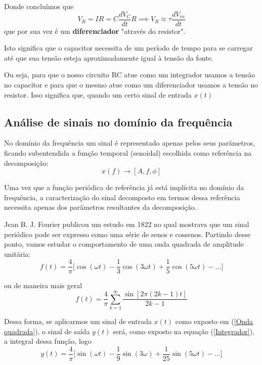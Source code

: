 \documentclass[letterpaper, 12pt]{article}
\begin{document}
Donde concluímos que
\begin{equation}
    V_{R}=IR=C\frac{dV_{C}}{dt}R\implies V_{R}\approx \tau\frac{dV_{in}}{dt}
\end{equation}
que por sua vez é um {\bf diferenciador} "através do resistor".

Isto significa que o capacitor necessita de um período de tempo para se carregar até que sua tensão esteja aproximadamente igual à tensão da fonte.

Ou seja, para que o nosso circuito RC atue como um integrador usamos a tensão no capacitor e para que o mesmo atue como um diferenciador usamos a tensão no resistor. Isso significa que, quando um certo sinal de entrada $x(t)$


\subsection{Análise de sinais no domínio da frequência}\label{subseção 2.3 - Análise de sinais}
No domínio da frequência um sinal é representado apenas pelos seus parâmetros, ficando subentendida a função temporal (senoidal) escolhida como referência na decomposição:
\begin{equation}
    x(f)\rightarrow[A,f,\phi]
\end{equation}

Uma vez que a função periódica de referência já está implícita no domínio da frequência, a caracterização do sinal decomposto em termos dessa referência necessita apenas dos parâmetros resultantes da decomposição.

Jean B. J. Fourier publicou um estudo em 1822 no qual mostrava que um sinal periódico pode ser expresso como uma série de senos e cossenos. Partindo desse ponto, vamos estudar o comportamento de uma onda quadrada de amplitude unitária:
\begin{equation}\label{Onda quadrada}
    f(t)=\frac{4}{\pi}\Bigg[\cos{(\omega t)}-\frac{1}{3}\cos{(3\omega t)}+\frac{1}{5}\cos{(5\omega t)}-\ldots\Bigg]
\end{equation}

ou de maneira mais geral
\begin{equation}\label{Onda quadrada - geral}
    f(t)=\frac{4}{\pi}\sum_{k=1}^{\infty}\frac{\sin{[2\pi(2k-1)t]}}{2k-1}
\end{equation}

Dessa forma, se aplicarmos um sinal de entrada $x(t)$ como exposto em (\ref{Onda quadrada}), o sinal de saída $y(t)$ será, como exposto na equação (\ref{Integrador}), a integral dessa função, logo
\begin{equation}\label{Onda triangular}
    y(t)=\frac{4}{\pi}\Bigg[\sin{(\omega t)}-\frac{1}{9}\sin{(3\omega)}+\frac{1}{25}\sin{(5\omega t)}-\ldots\Bigg]
\end{equation}
\end{document}
